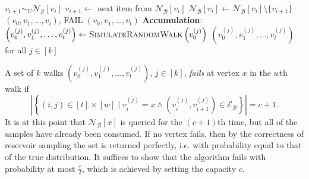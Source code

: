 \documentclass{report}
\newcommand{\algoname}[1]{\textnormal{\textsc{#1}}}
\begin{document}
\begin{algorithm}[htbp]
\begin{flushleft}
\begin{algorithmic}[1]
					\State $v_{i+1} \sim_U \mathcal{N}_\mathcal{S}[v_i]$
				\Else
						\State $v_{i+1} \gets$ next item from $\mathcal{N}_\mathcal{B}[v_i]$
						\State $\mathcal{N}_\mathcal{B}[v_i] \gets \mathcal{N}_\mathcal{B}[v_i] \setminus \{v_{i+1}\}$
					\Else
						\State \Return $(v_0, v_1, \dots, v_i)$, FAIL
					\EndIf
				\EndIf
			\EndFor
			\State \Return $(v_0, v_1, \dots, v_t)$
		\EndFunction
	\Statex \textbf{Accumulation}:
			\State $\left ( v_0^{(j)}, v_1^{(j)}, \dots, v_t^{(j)} \right ) \gets \algoname{SimulateRandomWalk} \left ( v_0^{(j)} \right )$
		\EndFor
		\State \Return $\left ( v_0^{(j)}, v_1^{(j)}, \dots, v_t^{(j)} \right )$ for all $j \in [k]$
\end{algorithmic}
\end{flushleft}
\end{algorithm}

A set of $k$ walks $\left ( v_0^{(j)}, v_1^{(j)}, \dots, v_t^{(j)} \right )$, $j \in [k]$, \emph{fails} at vertex $x$ in the $w$th walk if 
\begin{equation*}
\left | \left \{ (i,j) \in [t] \times [w] \mid v_i^{(j)} = x 
		\wedge (v_i^{(j)}, v_{i+1}^{(j)}) \in \mathcal{E}_\mathcal{B} \right \} \right | = c + 1.
\end{equation*}
It is at this point that $\mathcal{N}_\mathcal{B}[x]$ is queried for the $(c+1)$th time, but all of the samples have already been consumed.
If no vertex fails, then by the correctness of reservoir sampling the set is returned perfectly, i.e. with probability equal to that of the true distribution.
It suffices to show that the algorithm fails with probability at most $\frac{\varepsilon}{2}$, which is achieved by setting the capacity $c$.
\end{document}
